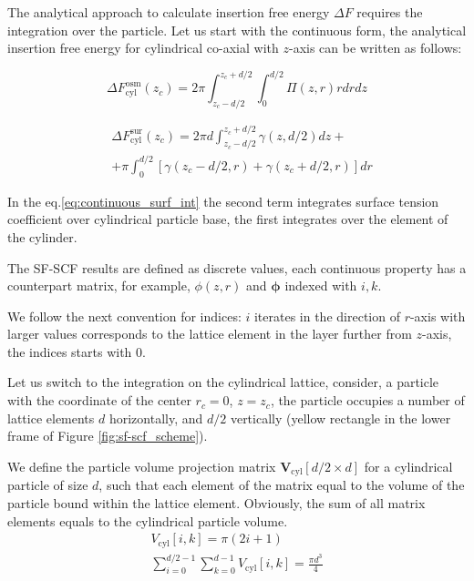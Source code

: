 \documentclass[10pt, a4paper]{article}
\begin{document}
\begin{multicols}{2}
The analytical approach to calculate insertion free energy $\Delta F$ requires the integration over the particle.
Let us start with the continuous form, the analytical insertion free energy for cylindrical co-axial with $z$-axis can be written as follows:

\begin{equation}
    \Delta F_{\textrm{cyl}}^{\textrm{osm}}(z_c) = 2 \pi \int_{z_c-d/2}^{z_c+d/2} \int_{0}^{d/2} \Pi(z, r) r dr dz
\end{equation}


\begin{equation}\label{eq:continuous_surf_int}
    \begin{aligned}
        &\Delta F_{\textrm{cyl}}^{\textrm{sur}}(z_c) = 2 \pi d \int_{z_c-d/2}^{z_c+d/2} \gamma(z,d/2) dz +
        \\
        &+ \pi \int_{0}^{d/2} \left[\gamma(z_c-d/2, r) + \gamma(z_c+d/2,r)\right] dr
    \end{aligned}
\end{equation}

In the eq.\ref{eq:continuous_surf_int} the second term integrates surface tension coefficient over cylindrical particle base, the first integrates over the element of the cylinder.

The SF-SCF results are defined as discrete values, each continuous property has a counterpart matrix, for example, $\phi(z,r)$ and $\bm{\phi}$ indexed with $i,k$.

We follow the next convention for indices: $i$ iterates in the direction of $r$-axis with larger values corresponds to the lattice element in the layer further from $z$-axis, the indices starts with $0$.

Let us switch to the integration on the cylindrical lattice, consider, a particle with the coordinate of the center $r_c=0$, $z = z_{c}$, the particle occupies a number of lattice elements $d$ horizontally, and $d/2$ vertically (yellow rectangle in the lower frame of Figure \ref{fig:sf-scf_scheme}).

We define the particle volume projection matrix $\mathbf{V}_{\textrm{cyl}}[d/2 \times d]$ for a cylindrical particle of size $d$, such that each element of the matrix equal to the volume of the particle bound within the lattice element.
Obviously, the sum of all matrix elements equals to the cylindrical particle volume.
\begin{eqnarray}
    V_{\textrm{cyl}}[i, k] = \pi(2i + 1)
    \\
    \sum_{i=0}^{d/2-1} \sum_{k=0}^{d-1} V_{\textrm{cyl}}[i, k] = \frac{\pi d^3}{4}
\end{eqnarray}


\end{multicols}
\end{document}
